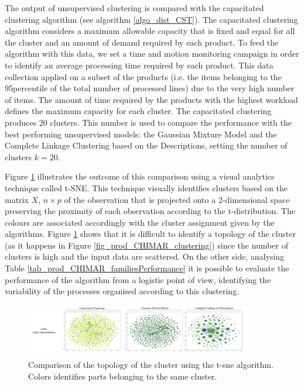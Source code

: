 The output of unsupervised clustering is compared with the capacitated clustering algorithm (see algorithm \ref{algo_dist_CST}). The capacitated clustering algorithm considers a maximum allowable capacity that is fixed and equal for all the cluster and an amount of demand required by each product. To feed the algorithm with this data, we set a time and motion monitoring campaign in order to identify an average processing time required by each product. This data collection applied on a subset of the products (i.e. the items belonging to the 95\degree percentile of the total number of processed lines) due to the very high number of items. The amount of time required by the products with the highest workload defines the maximum capacity for each cluster. The capacitated clustering produces 20 clusters. This number is used to compare the performance with the best performing unsupervised models: the Gaussian Mixture Model and the Complete Linkage Clustering based on the Descriptions, setting the number of clusters $k=20$. \par

Figure \ref{fig_prod_CHIMAR_clusteringVisualisation} illustrates the outcome of this comparison using a visual analytics technique called t-SNE. This technique visually identifies clusters based on the matrix $X$, $n\times p$ of the observation that is projected onto a 2-dimensional space preserving the proximity of each observation according to the t-distribution. The colours are associated accordingly with the cluster assignment given by the algorithms. Figure \ref{fig_prod_CHIMAR_clusteringVisualisation} shows that it is difficult to identify a topology of the cluster (as it happens in Figure \ref{fig_prod_CHIMAR_clustering}) since the number of clusters is high and the input data are scattered. On the other side, analysing Table \ref{tab_prod_CHIMAR_familiesPerformance} it is possible to evaluate the performance of the algorithm from a logistic point of view, identifying the variability of the processes organised according to this clustering. 

\begin{figure}[hbt!]
\centering
\includegraphics[width=0.9\textwidth]{sectionProduction/design_plant_figures/fig_prod_CHIMAR_clusteringVisualisation.png}
\captionsetup{type=figure}
\caption{Comparison of the topology of the cluster using the t-sne algorithm. Colors identifies parts belonging to the same cluster.}
\label{fig_prod_CHIMAR_clusteringVisualisation}
\end{figure}

